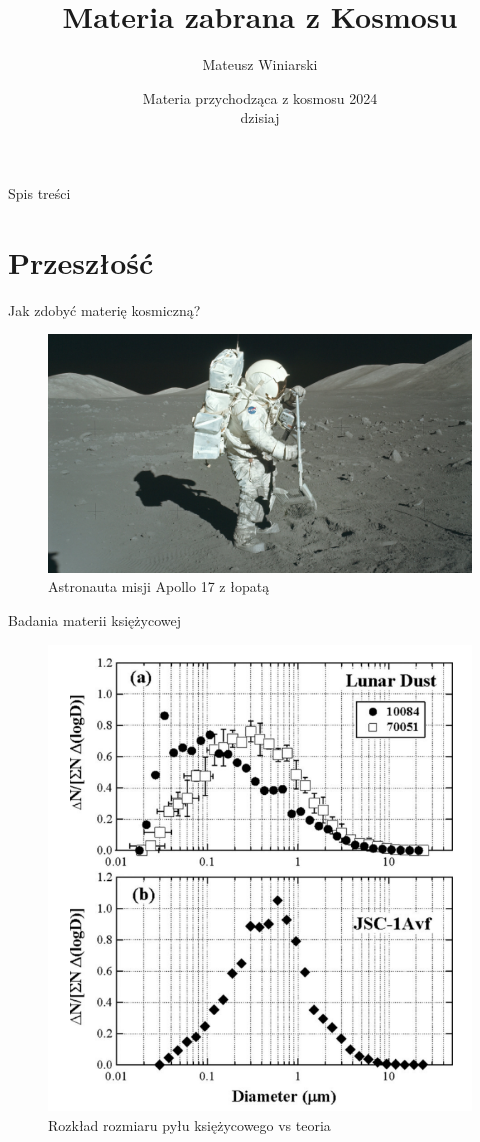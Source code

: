 \documentclass{beamer}
\title{Materia zabrana z Kosmosu}
\author[M. Winiarski]{Mateusz Winiarski}
\institute[Materia przychodząca z Kosmosu]{fizyka IV$^1$, WFAIS UJ}
\date[today]{Materia przychodząca z kosmosu 2024\\dzisiaj}
\begin{document}
\frame{\titlepage}

\begin{frame}{Spis treści}
    \tableofcontents
\end{frame}

\section{Przeszłość}
\begin{frame}{Jak zdobyć materię kosmiczną?}
    \begin{figure}
        \centering
        \includegraphics[width=0.75\linewidth]{kosmos/ap17.png}
        \caption{Astronauta misji Apollo 17 z łopatą}
    \end{figure}
\end{frame}

\begin{frame}{Badania materii księżycowej}
    \begin{figure}
        \centering
        \includegraphics[width=0.5\linewidth]{kosmos/xd.png}
        \caption{Rozkład rozmiaru pyłu księżycowego vs teoria}
    \end{figure}
\end{frame}
\end{document}
